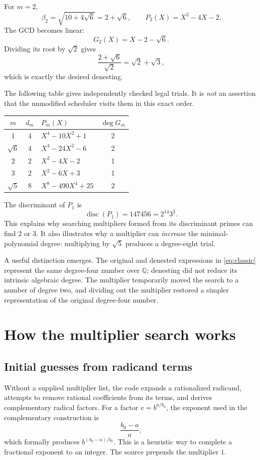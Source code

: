 \documentclass[11pt,letterpaper]{article}
\newcommand{\Q}{\mathbb{Q}}
\DeclareMathOperator{\disc}{disc}
\theoremstyle{definition}
\begin{document}
For $m=2$,
\[
  \beta_2=\sqrt{10+4\sqrt6}=2+\sqrt6,
  \qquad P_2(X)=X^2-4X-2.
\]
The GCD becomes linear:
\[
  G_2(X)=X-2-\sqrt6.
\]
Dividing its root by $\sqrt2$ gives
\[
  \frac{2+\sqrt6}{\sqrt2}=\sqrt2+\sqrt3,
\]
which is exactly the desired denesting.

The following table gives independently checked legal trials. It is \emph{not} an
assertion that the unmodified scheduler visits them in this exact order.
\begin{center}
\small
\begin{tabular}{@{}cclc@{}}
\toprule
$m$ & $d_m$ & $P_m(X)$ & $\deg G_m$\\\midrule
$1$ & 4 & $X^4-10X^2+1$ & 2\\
$\sqrt6$ & 4 & $X^4-24X^2-6$ & 2\\
$2$ & 2 & $X^2-4X-2$ & 1\\
$3$ & 2 & $X^2-6X+3$ & 1\\
$\sqrt5$ & 8 & $X^8-490X^4+25$ & 2\\
\bottomrule
\end{tabular}
\end{center}
The discriminant of $P_1$ is
\[
 \disc(P_1)=147456=2^{14}3^2.
\]
This explains why searching multipliers formed from its discriminant primes can
find $2$ or $3$. It also illustrates why a multiplier can \emph{increase} the
minimal-polynomial degree: multiplying by $\sqrt5$ produces a degree-eight trial.

A useful distinction emerges. The original and denested expressions in
\eqref{eq:classic} represent the same degree-four number over $\Q$; denesting did
not reduce its intrinsic algebraic degree. The multiplier temporarily moved the
search to a number of degree two, and dividing out the multiplier restored a
simpler representation of the original degree-four number.

\section{How the multiplier search works}
\label{sec:search}

\subsection{Initial guesses from radicand terms}
Without a supplied multiplier list, the code expands a rationalized radicand,
attempts to remove rational coefficients from its terms, and derives complementary
radical factors. For a factor $v=b^{a/b_0}$, the exponent used in the complementary
construction is
\[
  \frac{b_0-a}{a},
\]
which formally produces $b^{(b_0-a)/b_0}$. This is a heuristic way to complete a
fractional exponent to an integer. The source prepends the multiplier $1$.
\end{document}
